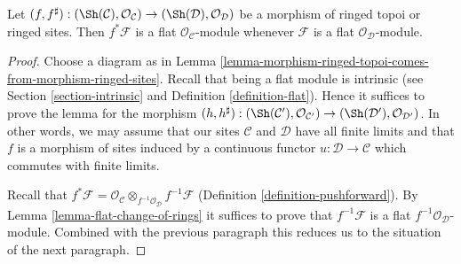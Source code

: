 \begin{lemma}
\label{lemma-pullback-flat}
\begin{reference}
\cite[Expos\'e V, Corollary 1.7.1]{SGA4}
\end{reference}
Let
$(f, f^\sharp) :
(\Sh(\mathcal{C}), \mathcal{O}_\mathcal{C})
\to
(\Sh(\mathcal{D}), \mathcal{O}_\mathcal{D})$
be a morphism of ringed topoi or ringed sites.
Then $f^*\mathcal{F}$ is a flat $\mathcal{O}_\mathcal{C}$-module
whenever $\mathcal{F}$ is a flat $\mathcal{O}_\mathcal{D}$-module.
\end{lemma}

\begin{proof}
Choose a diagram as in
Lemma \ref{lemma-morphism-ringed-topoi-comes-from-morphism-ringed-sites}.
Recall that being a flat module is intrinsic
(see Section \ref{section-intrinsic} and
Definition \ref{definition-flat}).
Hence it suffices to prove the lemma for
the morphism $(h, h^\sharp) :
(\Sh(\mathcal{C}'), \mathcal{O}_{\mathcal{C}'})
\to
(\Sh(\mathcal{D}'), \mathcal{O}_{\mathcal{D}'})$.
In other words, we may assume that
our sites $\mathcal{C}$ and $\mathcal{D}$
have all finite limits and that $f$ is a morphism
of sites induced by a continuous functor $u : \mathcal{D} \to \mathcal{C}$
which commutes with finite limits.

\medskip\noindent
Recall that $f^*\mathcal{F} =
\mathcal{O}_\mathcal{C} \otimes_{f^{-1}\mathcal{O}_\mathcal{D}}
f^{-1}\mathcal{F}$ (Definition \ref{definition-pushforward}).
By Lemma \ref{lemma-flat-change-of-rings} it suffices to
prove that $f^{-1}\mathcal{F}$ is a flat
$f^{-1}\mathcal{O}_\mathcal{D}$-module. Combined with
the previous paragraph this reduces us to the situation
of the next paragraph.


\end{proof}
